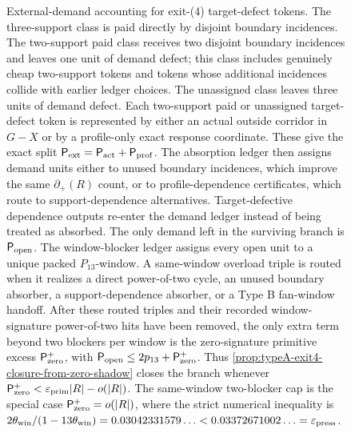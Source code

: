 \documentclass[11pt]{article}
\newcommand{\defp}{\partial_+}
\begin{document}
\begin{figure}[t]
{%
}
\caption[External-demand accounting for exit-(4) tokens]{External-demand
accounting for exit-(4) target-defect tokens.  The three-support class is paid
directly by disjoint boundary incidences.  The two-support paid class receives
two disjoint boundary incidences and leaves one unit of demand defect; this
class includes genuinely cheap two-support tokens and tokens whose additional
incidences collide with earlier ledger choices.  The unassigned class leaves
three units of demand defect.  Each two-support paid or unassigned
target-defect token is represented by either an actual outside corridor in
\(G-X\) or by a profile-only exact response coordinate.  These give the exact
split
\(\mathsf P_{\rm ext}=\mathsf P_{\rm act}+\mathsf P_{\rm prof}\).  The
absorption ledger then assigns demand units either to unused boundary
incidences, which improve the same \(\defp(R)\) count, or to profile-dependence
certificates, which route to support-dependence alternatives.
Target-defective dependence outputs re-enter the demand ledger instead of
being treated as absorbed.  The only demand left in the surviving branch is
\(\mathsf P_{\rm open}\).  The window-blocker ledger assigns every open unit to
a unique packed \(P_{13}\)-window.  A same-window overload triple is routed
when it realizes a direct power-of-two cycle, an unused boundary absorber, a
support-dependence absorber, or a Type B fan-window handoff.
After these routed triples and their recorded window-signature power-of-two hits have
been removed, the only extra term beyond two blockers per window is the
zero-signature primitive excess \(\mathsf P_{\rm zero}^{+}\), with
\(\mathsf P_{\rm open}\le2p_{13}+\mathsf P_{\rm zero}^{+}\).
Thus \cref{prop:typeA-exit4-closure-from-zero-shadow} closes the
branch whenever
\(\mathsf P_{\rm zero}^{+}<\varepsilon_{\rm prim}|R|-o(|R|)\).  The
same-window two-blocker cap is the special case
\(\mathsf P_{\rm zero}^{+}=o(|R|)\), where the strict numerical inequality is
\(2\theta_{\rm win}/(1-13\theta_{\rm win})
=0.03042331579\ldots<0.03372671002\ldots=\varepsilon_{\rm press}\).}
\label{fig:exit4-external-pressure-ledger}
\end{figure}
\end{document}
